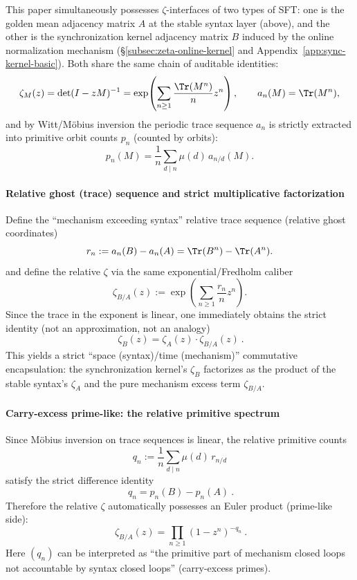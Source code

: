 \begin{remark}\label{rem:relative-zeta-sync-vs-grammar}
This paper simultaneously possesses \(\zeta\)-interfaces of two types of SFT: one is the golden mean adjacency matrix \(A\) at the stable syntax layer (above), and the other is the synchronization kernel adjacency matrix \(B\) induced by the online normalization mechanism (\S\ref{subsec:zeta-online-kernel} and Appendix~\ref{app:sync-kernel-basic}).
Both share the same chain of auditable identities:
\[
\zeta_M(z)=\det(I-zM)^{-1}
=\exp\!\left(\sum_{n\ge 1}\frac{\Tr(M^n)}{n}z^n\right),
\qquad
a_n(M)=\Tr(M^n),
\]
and by Witt/M\"obius inversion the periodic trace sequence \(a_n\) is strictly extracted into primitive orbit counts \(p_n\) (counted by orbits):
\[
p_n(M)=\frac{1}{n}\sum_{d\mid n}\mu(d)\,a_{n/d}(M).
\]

\paragraph{Relative ghost (trace) sequence and strict multiplicative factorization}
Define the ``mechanism exceeding syntax'' relative trace sequence (relative ghost coordinates)
\[
r_n:=a_n(B)-a_n(A)=\Tr(B^n)-\Tr(A^n).
\]
and define the relative \(\zeta\) via the same exponential/Fredholm caliber
\[
\zeta_{B/A}(z):=\exp\!\left(\sum_{n\ge 1}\frac{r_n}{n}z^n\right).
\]
Since the trace in the exponent is linear, one immediately obtains the strict identity (not an approximation, not an analogy)
$$
\boxed{\ \zeta_B(z)=\zeta_A(z)\cdot \zeta_{B/A}(z)\ }.
$$
This yields a strict ``space (syntax)/time (mechanism)'' commutative encapsulation: the synchronization kernel's \(\zeta_B\) factorizes as the product of the stable syntax's \(\zeta_A\) and the pure mechanism excess term \(\zeta_{B/A}\).

\paragraph{Carry-excess prime-like: the relative primitive spectrum}
Since M\"obius inversion on trace sequences is linear, the relative primitive counts
\[
q_n:=\frac{1}{n}\sum_{d\mid n}\mu(d)\,r_{n/d}
\]
satisfy the strict difference identity
$$
\boxed{\ q_n=p_n(B)-p_n(A)\ }.
$$
Therefore the relative \(\zeta\) automatically possesses an Euler product (prime-like side):
$$
\boxed{\ \zeta_{B/A}(z)=\prod_{n\ge 1}(1-z^n)^{-q_n}\ }.
$$
Here \((q_n)\) can be interpreted as ``the primitive part of mechanism closed loops not accountable by syntax closed loops'' (carry-excess primes).


\end{remark}
